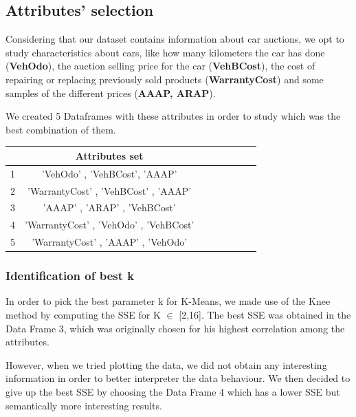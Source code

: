\documentclass{article}
\begin{document}
\subsection{Attributes' selection}
Considering that our dataset contains information about car auctions, we opt to study characteristics about cars, like how many kilometers the car has done (\textbf{VehOdo}), the auction selling price for the car (\textbf{VehBCost}), the cost of repairing or replacing previously sold products (\textbf{WarrantyCost}) and some samples of the different prices (\textbf{AAAP, ARAP}).

We created 5 Dataframes with these attributes in order to study which was the best combination of them.

\begin{table}[H]
\centering
\begin{tabular}{c|ccccccc}
\hline
 & Attributes set \\
\hline
\rowcolor{Gray}
1 & 'VehOdo' ,  'VehBCost',  'AAAP' \\
2 & 'WarrantyCost' , 'VehBCost' ,  'AAAP'  \\
\rowcolor{Gray}
3 & 'AAAP' ,  'ARAP' ,  'VehBCost' \\
4 & 'WarrantyCost' ,  'VehOdo' ,  'VehBCost'  \\
\rowcolor{Gray}
5 & 'WarrantyCost' ,  'AAAP' , 'VehOdo' \\
    \end{tabular}
    \end{table}


\subsubsection{Identification of best k}

    
In order to pick the best parameter k for K-Means, we made use of the Knee method by computing the SSE for K $\in$ [2,16]. The best SSE was obtained in the Data Frame 3, which was originally chosen for his highest correlation among the attributes.

However, when we tried plotting the data, we did not obtain any interesting information in order to better interpreter the data behaviour. We then decided to give up the best SSE by choosing the Data Frame 4 which has a lower SSE but semantically more interesting results.
\end{document}
